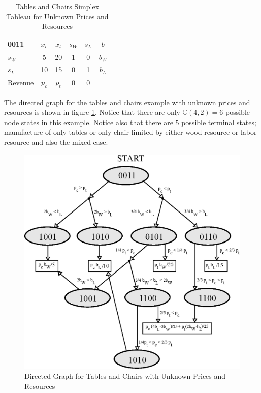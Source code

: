 \begin{table}
\centering
\begin{tabular}{| l | c c c c | c |}
\hline
0011    & $x_c$ & $x_t$ & $s_W$ & $s_L$ & $b$\\
\hline
$s_W$   & 5     & 20    & 1     & 0     & $b_W$\\
$s_L$   & 10    & 15    & 0     & 1     & $b_L$\\
\hline
Revenue & $p_c$    & $p_t$    & 0     & 0     &\\
\hline
\end{tabular}
  \caption[Tables and Chairs Simplex Tableau for Unknown Prices and Resources]
          {Tables and Chairs Simplex Tableau for Unknown Prices and Resources}
  \label{tab:pr0011}
\end{table}

The directed graph for the tables and chairs example with unknown prices and resources is shown in figure \ref{fig:tcpr_directed_graph}. Notice that there are only $\mathbb{C}(4,2) = 6$ possible node states in this example. Notice also that there are $5$ possible terminal states; manufacture of only tables or only chair limited by either wood resource or labor resource and also the mixed case.  

\begin{figure}
  \centering
  \includegraphics{Images/tcpr_directed_graph}
  \caption[Directed Graph for Tables and Chairs with Unknown Prices and Resources]
          {Directed Graph for Tables and Chairs with Unknown Prices and Resources}
  \label{fig:tcpr_directed_graph}
\end{figure}

